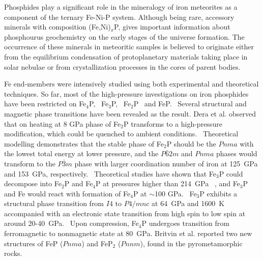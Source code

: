 \documentclass[twoside,twocolumn,9pt]{article}
\begin{document}
Phosphides play a significant role in the mineralogy of iron meteorites as a component of the ternary Fe-Ni-P system. 
Although being rare, accessory minerals  with  composition  (Fe,Ni)$_x$P, gives important information about phosphourus geochemistry on the early stages of the universe formation. \cite{Skala2005, skala_m-2003, Buseck1969, Britvin-2002, Pratesi-2006, reed_1968, Britvin2019-SciRep, Britvin2019-PCM-Fe2P, Britvin2019-murashkoite-MP-FeP, Britvin2020-Halamishite}
The occurrence  of  these  minerals  in  meteoritic  samples  is  believed  to originate either from the equilibrium condensation of protoplanetary materials  taking  place  in  solar nebulae  or  from  crystallization processes  in  the  cores  of  parent  bodies. 



Fe end-members were intensively studied using both experimental and theoretical techniques. 
So far, most of the high-pressure investigations on iron phosphides have been restricted on Fe$_4$P,~\cite{Wu-2011-GRL} Fe$_3$P,~\cite{Scott-2007-GRL} Fe$_2$P~\cite{Dera-2008-GRL, Wu_2010-JPCM} and FeP.~\cite{Gu-2011-FeP-EPS}
Several structural and magnetic phase transitions have been revealed as the result. 
Dera et al. observed that on heating at 8 GPa phase of Fe$_2$P transforms to a high-pressure modification, which could be quenched to ambient conditions.~\cite{Dera-2008-GRL} 
Theoretical modelling demonstrates that the stable phase of Fe$_2$P should be the $Pnma$ with the lowest total energy at lower pressure, and the $P\bar{6}2m$ and $Pnma$ phases would transform to the $P\bar{3}m$ phase with larger coordination number of iron at 125~GPa and 153~GPa, respectively.~\cite{Wu_2010-JPCM} 
Theoretical studies have shown that Fe$_3$P could decompose into Fe$_2$P and Fe$_4$P at pressures higher than 214~GPa ~\cite{Zhao-2017-RSC-Adv}, and Fe$_3$P and Fe would react with formation of Fe$_4$P at $\sim$100 GPa.~\cite{Wu-2011-GRL} 
Fe$_3$P exhibits a structural phase transition from $I4$ to $P4/mnc$ at 64~GPa and 1600~K accompanied with an electronic state transition from high spin to low spin at around 20-40~GPa.~\cite{GU2014-EPSL, Gu-2016-AmMiner-Fe3P}
Upon compression, Fe$_4$P undergoes transition from ferromagnetic to nonmagnetic state at 80~GPa.\cite{Wu-2011-GRL}
Britvin et al. reported two new structures of FeP ($Pnma$) and FeP$_2$ ($Pnnm$), found in the pyrometamorphic rocks.  \cite {Britvin2019-PCM-Fe2P,Britvin2019-murashkoite-MP-FeP}
\end{document}
